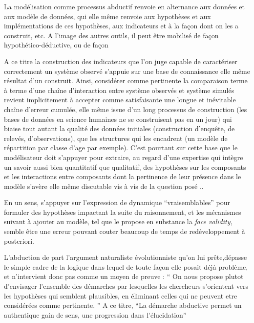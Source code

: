 La modélisation comme processus abductif renvoie en alternance aux données et aux modèle de données, qui elle même renvoie aux hypothèses et aux implémentations de ces hypothèses, aux indicateurs et à la façon dont on les a construit, etc. A l'image des autres outils, il peut être mobilisé de façon hypothético-déductive, ou de façon 




A ce titre la construction des indicateurs que l'on juge capable de caractériser correctement un système observé s'appuie sur une base de connaissance elle même résultat d'un construit. Ainsi, considérer comme pertinente la comparaison terme à terme d'une chaîne d'interaction entre système observés et système simulés  revient implicitement à accepter comme satisfaisante une longue et inévitable chaîne d'erreur cumulée, elle même issue d'un long processus de construction (les bases de données en science humaines ne se construisent pas en un jour) qui biaise tout autant la qualité des données initiales (construction d'enquête, de relevés, d'observations), que les structures qui les encadrent (un modèle de répartition par classe d'age par exemple). C'est pourtant sur cette base que le modélisateur doit s'appuyer pour extraire, au regard d'une expertise qui intègre un savoir aussi bien quantitatif que qualitatif, des hypothèses sur les composants et les interactions entre composants dont la pertinence de leur présence dans le modèle s'avère elle même discutable vis à vis de la question posé ..



En un sens, s'appuyer sur l'expression de dynamique \enquote{vraisemblables} pour formuler des hypothèses impactant la suite du raisonnement, et les mécanismes suivant à ajouter au modèle, tel que le propose en substance la \textit{face validity}, semble être une erreur pouvant couter beaucoup de temps de redéveloppement à posteriori.






L'abduction de part l'argument naturaliste évolutionniste qu'on lui prête,dépasse le simple cadre de la logique dans lequel de toute façon elle posait déjà problème, et n'intervient donc pas comme un moyen de preuve : \enquote{ On nous propose plutot d’envisager l’ensemble des démarches par lesquelles les chercheurs s’orientent vers les hypothèses qui semblent plausibles, en éliminant celles qui ne peuvent etre considérées comme pertinente. } A ce titre, \enquote{La démarche abductive permet un authentique gain de sens, une progression dans l’élucidation}



